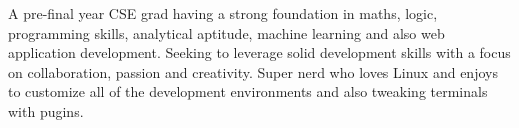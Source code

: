 

\begin{cvparagraph}

A pre-final year CSE grad having a strong foundation in maths, logic, programming skills, analytical aptitude, machine learning and also web application development. Seeking to leverage solid development skills with a focus on collaboration, passion and creativity. Super nerd who loves Linux and enjoys to customize all of the development environments and also tweaking terminals with pugins.
\end{cvparagraph}
